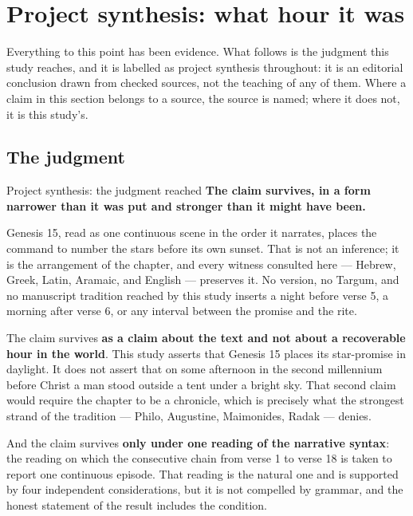 \section{Project synthesis: what hour it was}

Everything to this point has been evidence. What follows is the judgment this
study reaches, and it is labelled as project synthesis throughout: it is an
editorial conclusion drawn from checked sources, not the teaching of any of them.
Where a claim in this section belongs to a source, the source is named; where it
does not, it is this study's.

\subsection{The judgment}

\begin{studybox}{Project synthesis: the judgment reached}
\textbf{The claim survives, in a form narrower than it was put and stronger than
it might have been.}

Genesis 15, read as one continuous scene in the order it narrates, places the
command to number the stars before its own sunset. That is not an inference; it
is the arrangement of the chapter, and every witness consulted here --- Hebrew,
Greek, Latin, Aramaic, and English --- preserves it. No version, no Targum, and
no manuscript tradition reached by this study inserts a night before verse 5, a
morning after verse 6, or any interval between the promise and the rite.

The claim survives \textbf{as a claim about the text and not about a recoverable
hour in the world}. This study asserts that Genesis 15 places its star-promise in
daylight. It does not assert that on some afternoon in the second millennium
before Christ a man stood outside a tent under a bright sky. That second claim
would require the chapter to be a chronicle, which is precisely what the
strongest strand of the tradition --- Philo, Augustine, Maimonides, Radak ---
denies.

And the claim survives \textbf{only under one reading of the narrative syntax}:
the reading on which the consecutive chain from verse 1 to verse 18 is taken to
report one continuous episode. That reading is the natural one and is supported
by four independent considerations, but it is not compelled by grammar, and the
honest statement of the result includes the condition.
\end{studybox}

